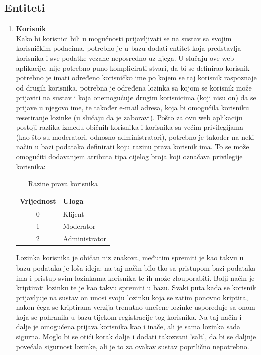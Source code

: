 \documentclass[times, utf8, zavrsni, numeric]{fer}
\begin{document}
\subsection{Entiteti}
\begin{enumerate}[leftmargin=*]
\item \textbf{Korisnik}\\
Kako bi korisnici bili u mogućnosti prijavljivati se na sustav sa svojim korisničkim podacima, potrebno je u bazu dodati entitet koja predstavlja korisnika i sve podatke vezane neposredno uz njega. U slučaju ove web aplikacije, nije potrebno puno komplicirati stvari, da bi se definirao korisnik potrebno je imati određeno korisničko ime po kojem se taj korisnik raspoznaje od drugih korisnika, potrebna je određena lozinka sa kojom se korisnik može prijaviti na sustav i koja onemogućuje drugim korisnicima (koji nisu on) da se prijave u njegovo ime, te također e-mail adresa, koja bi omogućila korisniku resetiranje lozinke (u slučaju da je zaboravi). Pošto za ovu web aplikaciju postoji razlika između običnih korisnika i korisnika sa većim privilegijama (kao što su moderatori, odnosno administratori), potrebno je također na neki način u bazi podataka definirati koju razinu prava korisnik ima. To se može omogućiti dodavanjem atributa tipa cijelog broja koji označava privilegije korisnika:

\begin{table}[H]
\caption{Razine prava korisnika}
\label{tbl:razine_prava}
\centering
\begin{tabular}{cl}
\hline
Vrijednost & Uloga\\
\hline
0 & Klijent \\
1 & Moderator \\
2 & Administrator \\ 
\hline
\end{tabular}
\end{table}

Lozinka korisnika je običan niz znakova, međutim spremiti je kao takvu u bazu podataka je loša ideja: na taj način bilo tko sa pristupom bazi podataka ima i pristup svim lozinkama korisnika te ih može zlouporabiti. Bolji način je kriptirati lozinku te je kao takvu spremiti u bazu. Svaki puta kada se korisnik prijavljuje na sustav on unosi svoju lozinku koja se zatim ponovno kriptira, nakon čega se kriptirana verzija trenutno unešene lozinke uspoređuje sa onom koja se pohranila u bazu tijekom registracije tog korisnika. Na taj način i dalje je omogućena prijava korisnika kao i inače, ali je sama lozinka sada sigurna. Moglo bi se otići korak dalje i dodati takozvani 'salt', da bi se daljnje povećala sigurnost lozinke, ali je to za ovakav sustav poprilično nepotrebno.


\end{enumerate}
\end{document}
